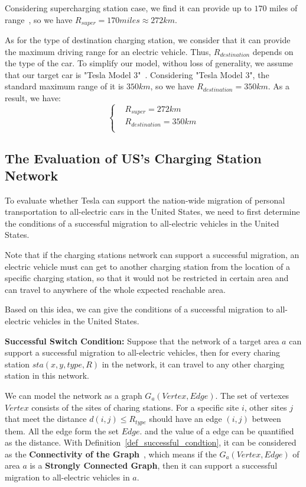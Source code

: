 Considering supercharging station case,
we find it can provide up to $170$ miles of range~\cite{SuperRange},
so we have $R_{super} = 170miles \approx 272km$.

As for the type of destination charging station,
we consider that it can provide the maximum driving range for an electric vehicle.
Thus, $R_{destination}$ depends on the type of the car.
To simplify our model, withou loss of generality, we assume that our target car is "Tesla Model 3"~\cite{CarRange}.
Considering "Tesla Model 3", the standard maximum range of it is $350km$,
so we have $R_{destination} = 350km$.
As a result, we have:
\begin{equation}
\label{equ_R}
\left\{
\begin{aligned}
& R_{super} = 272km \\
& R_{destination} = 350km \\
\end{aligned}
\right.
\end{equation}

\subsection{The Evaluation of US's Charging Station Network }
To evaluate whether Tesla can support the nation-wide migration of personal transportation to all-electric cars in the United States,
we need to first determine the conditions of a successful migration to all-electric vehicles in the United States.

Note that if the charging stations network can support a successful migration,
an electric vehicle must can get to another charging station from the location of a specific charging station,
so that it would not be restricted in certain area and can travel to anywhere of the whole expected reachable area.

Based on this idea, we can give the conditions of a successful migration to all-electric vehicles in the United States.
\begin{definition}
\label{def_successful_condtion}
\textbf{Successful Switch Condition:}
Suppose that the network of a target area $a$ can support a successful migration to all-electric vehicles,
then for every charing station $sta(x, y, type, R)$ in the network,
it can travel to any other charging station in this network.
\end{definition}

We can model the network as a graph $G_{a}(Vertex, Edge)$.
The set of vertexes $Vertex$ consists of the sites of charing stations.
For a specific site $i$, other sites $j$ that meet the distance $d(i,j) \leqslant R_{type}$ should have an edge $(i,j)$ between them.
All the edge form the set $Edge$.
and the value of a edge can be quantified as the distance.
With Definition~\ref{def_successful_condtion},
it can be considered as the \textbf{Connectivity of the Graph}~\cite{connectivity},
which means if the $G_{a}(Vertex, Edge)$ of area $a$ is a \textbf{Strongly Connected Graph},
then it can support a successful migration to all-electric vehicles in $a$.

